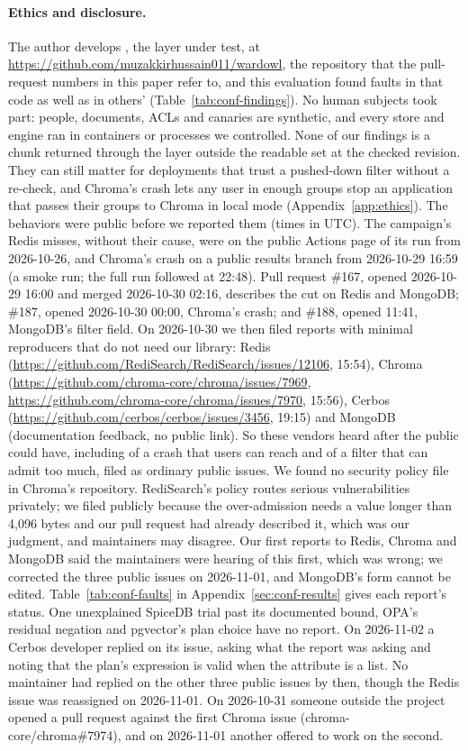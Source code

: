 \paragraph{Ethics and disclosure.}\label{sec:limits-ethics}
The author develops \sys{}, the layer under test, at \url{https://github.com/muzakkirhussain011/wardowl}, the repository that the pull-request numbers in
this paper refer to, and this evaluation found faults in that code as well as in others' (Table~\ref{tab:conf-findings}). No human subjects took part: people, documents, ACLs and canaries are synthetic, and every store and engine ran in containers or processes we
controlled. None of our findings is a chunk returned through the layer outside the readable set at the checked revision. They can still matter for
deployments that trust a pushed-down filter without a re-check, and Chroma's crash lets any user in enough groups stop an application that passes
their groups to Chroma in local mode (Appendix~\ref{app:ethics}). The behaviors were public before we reported them (times in UTC). The campaign's Redis misses, without their cause, were on the public Actions page of its run from 2026-10-26, and Chroma's crash on a public results branch from 2026-10-29 16:59 (a smoke run; the full run followed at 22:48). Pull request \#167, opened 2026-10-29 16:00 and merged 2026-10-30 02:16, describes the cut on Redis and MongoDB; \#187, opened 2026-10-30 00:00, Chroma's crash; and \#188, opened 11:41, MongoDB's filter field. On 2026-10-30 we then filed reports with minimal reproducers that do not need our library:
Redis (\url{https://github.com/RediSearch/RediSearch/issues/12106}, 15:54), Chroma (\url{https://github.com/chroma-core/chroma/issues/7969},
\url{https://github.com/chroma-core/chroma/issues/7970}, 15:56), Cerbos (\url{https://github.com/cerbos/cerbos/issues/3456}, 19:15) and MongoDB (documentation
feedback, no public link). So these vendors heard after the public could have, including of a crash that users can reach and of a filter that can admit too much, filed as ordinary public issues. We found no security policy file in Chroma's repository. RediSearch's policy routes serious vulnerabilities privately; we filed publicly because the over-admission needs a value longer than 4,096 bytes and our pull request had already described it, which was our judgment, and maintainers may disagree. Our first reports to Redis, Chroma and MongoDB said the maintainers were hearing of this first, which was wrong; we corrected the three public issues on 2026-11-01, and MongoDB's form cannot be edited.
Table~\ref{tab:conf-faults} in Appendix~\ref{sec:conf-results} gives each report's status. One unexplained SpiceDB trial past its documented bound, OPA's residual negation and pgvector's plan
choice have no report. On 2026-11-02 a Cerbos developer replied on its issue, asking what the report was asking and noting that the plan's expression is valid when the attribute is a list. No maintainer had replied on the other three public issues by then, though the Redis issue was reassigned on 2026-11-01. On 2026-10-31 someone outside the project opened a pull request against the first Chroma issue (chroma-core/chroma\#7974), and on 2026-11-01 another offered to work on the second.

